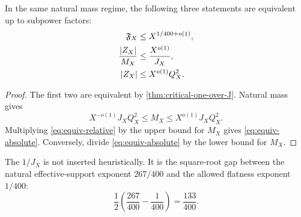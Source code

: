 \begin{corollary}
\label{cor:relative-absolute}
In the same natural mass regime, the following three statements are
equivalent up to subpower factors:
\begin{align}
 \mathfrak F_X&\le X^{1/400+o(1)},
 \label{eq:equiv-flatness}\\
 \frac{|Z_X|}{M_X}&\le\frac{X^{o(1)}}{J_X},
 \label{eq:equiv-relative}\\
 |Z_X|&\le X^{o(1)}Q_X^2.
 \label{eq:equiv-absolute}
\end{align}
\end{corollary}

\begin{proof}
The first two are equivalent by
\cref{thm:critical-one-over-J}.  Natural mass gives
\[
 X^{-o(1)}J_XQ_X^2
 \le M_X\le
 X^{o(1)}J_XQ_X^2.
\]
Multiplying \eqref{eq:equiv-relative} by the upper bound for \(M_X\)
gives \eqref{eq:equiv-absolute}.  Conversely, divide
\eqref{eq:equiv-absolute} by the lower bound for \(M_X\).
\end{proof}

\begin{remark}
The \(1/J_X\) is not inserted heuristically.  It is the square-root
gap between the natural effective-support exponent \(267/400\) and
the allowed flatness exponent \(1/400\):
\[
 \frac12\left(\frac{267}{400}-\frac1{400}\right)
 =
 \frac{133}{400}.
\]
\end{remark}
